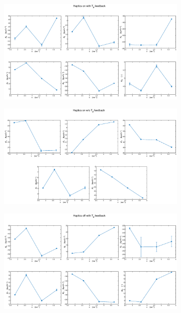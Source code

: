      \begin{figure}
        \centering
        \begin{subfigure}[b]{\textwidth}
            \centering
            \includegraphics[width=1\linewidth]{images/gain_plots/hap_on_td_predict.eps}
            \caption{}
            \label{fig:gains_speed1}
        \end{subfigure}
        \begin{subfigure}[b]{\textwidth}
            \centering
            \includegraphics[width=1\linewidth]{images/gain_plots/hap_on_predict.eps}
            \caption{}            
            \label{fig:gains_speed2}
        \end{subfigure}
        \begin{subfigure}[b]{\textwidth}
            \centering
            \includegraphics[width=1\linewidth]{images/gain_plots/hap_off_td_predict.eps}

\end{subfigure}
\end{figure}
